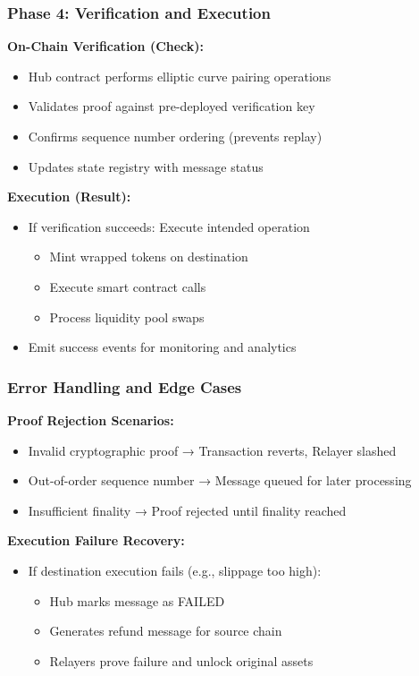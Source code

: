 \documentclass[11pt,a4paper]{article}
\begin{document}
\subsubsection*{Phase 4: Verification and Execution}

\textbf{On-Chain Verification (Check):}
\begin{itemize}
    \item Hub contract performs elliptic curve pairing operations
    \item Validates proof against pre-deployed verification key
    \item Confirms sequence number ordering (prevents replay)
    \item Updates state registry with message status
\end{itemize}

\textbf{Execution (Result):}
\begin{itemize}
    \item If verification succeeds: Execute intended operation
        \begin{itemize}
            \item Mint wrapped tokens on destination
            \item Execute smart contract calls
            \item Process liquidity pool swaps
        \end{itemize}
    \item Emit success events for monitoring and analytics
\end{itemize}

\subsubsection*{Error Handling and Edge Cases}

\textbf{Proof Rejection Scenarios:}
\begin{itemize}
    \item Invalid cryptographic proof → Transaction reverts, Relayer slashed
    \item Out-of-order sequence number → Message queued for later processing
    \item Insufficient finality → Proof rejected until finality reached
\end{itemize}

\textbf{Execution Failure Recovery:}
\begin{itemize}
    \item If destination execution fails (e.g., slippage too high):
        \begin{itemize}
            \item Hub marks message as FAILED
            \item Generates refund message for source chain
            \item Relayers prove failure and unlock original assets
        \end{itemize}
\end{itemize}
\end{document}

